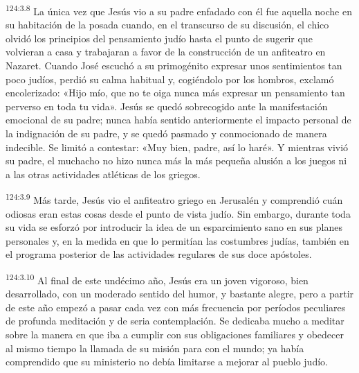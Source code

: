 \par
\textsuperscript{124:3.8} La única vez que Jesús vio a su padre enfadado con él fue aquella noche en su habitación de la posada cuando, en el transcurso de su discusión, el chico olvidó los principios del pensamiento judío hasta el punto de sugerir que volvieran a casa y trabajaran a favor de la construcción de un anfiteatro en Nazaret. Cuando José escuchó a su primogénito expresar unos sentimientos tan poco judíos, perdió su calma habitual y, cogiéndolo por los hombros, exclamó encolerizado: «Hijo mío, que no te oiga nunca más expresar un pensamiento tan perverso en toda tu vida». Jesús se quedó sobrecogido ante la manifestación emocional de su padre; nunca había sentido anteriormente el impacto personal de la indignación de su padre, y se quedó pasmado y conmocionado de manera indecible. Se limitó a contestar: «Muy bien, padre, así lo haré». Y mientras vivió su padre, el muchacho no hizo nunca más la más pequeña alusión a los juegos ni a las otras actividades atléticas de los griegos.

\par
\textsuperscript{124:3.9} Más tarde, Jesús vio el anfiteatro griego en Jerusalén y comprendió cuán odiosas eran estas cosas desde el punto de vista judío. Sin embargo, durante toda su vida se esforzó por introducir la idea de un esparcimiento sano en sus planes personales y, en la medida en que lo permitían las costumbres judías, también en el programa posterior de las actividades regulares de sus doce apóstoles.

\par
\textsuperscript{124:3.10} Al final de este undécimo año, Jesús era un joven vigoroso, bien desarrollado, con un moderado sentido del humor, y bastante alegre, pero a partir de este año empezó a pasar cada vez con más frecuencia por períodos peculiares de profunda meditación y de seria contemplación. Se dedicaba mucho a meditar sobre la manera en que iba a cumplir con sus obligaciones familiares y obedecer al mismo tiempo la llamada de su misión para con el mundo; ya había comprendido que su ministerio no debía limitarse a mejorar al pueblo judío.


